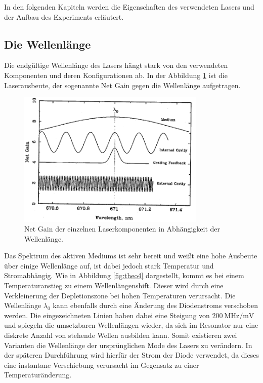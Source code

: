 In den folgenden Kapiteln werden die Eigenschaften des verwendeten Lasers und der Aufbau des Experiments erläutert.

\subsection{Die Wellenlänge}
Die endgültige Wellenlänge des Lasers hängt stark von den verwendeten Komponenten und deren Konfigurationen ab. In der Abbildung \ref{theo3} ist die Laserausbeute, der sogenannte Net Gain gegen die Wellenlänge aufgetragen.

\begin{figure}[H]
\centering
\includegraphics[width=0.8\textwidth]{ressources/net_gain.png}
\caption{Net Gain der einzelnen Laserkomponenten in Abhängigkeit der Wellenlänge. \cite{skript}}
\label{theo3}
\end{figure}

Das Spektrum des aktiven Mediums ist sehr bereit und weißt eine hohe Ausbeute über einige Wellenlänge auf, ist dabei jedoch stark Temperatur und Stromabhängig. Wie in Abbildung \ref{fig:theo4} dargestellt, kommt es bei einem Temperaturanstieg zu einem Wellenlängenshift. Dieser wird durch eine Verkleinerung der Depletionszone bei hohen Temperaturen verursacht. Die Wellenlänge $\lambda_0$ kann ebenfalls durch eine Änderung des Diodenstroms verschoben werden. Die eingezeichneten Linien haben dabei eine Steigung von $\SI{200}{\mega\hertz\per\milli\volt}$ und spiegeln die umsetzbaren Wellenlängen wieder, da sich im Resonator nur eine diskrete Anzahl von stehende Wellen ausbilden kann. Somit existieren zwei Varianten die Wellenlänge der ursprünglichen Mode des Lasers zu verändern. In der späteren Durchführung wird hierfür der Strom der Diode verwendet, da dieses eine instantane Verschiebung verursacht im Gegensatz zu einer Temperaturänderung.

